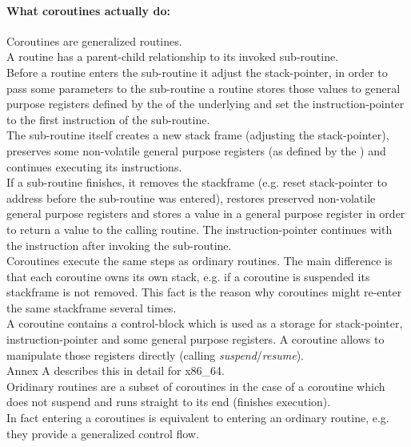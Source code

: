 \paragraph*{What coroutines actually do:}
Coroutines are generalized routines.\\
\newline
A routine has a parent-child relationship to its invoked sub-routine.\\
Before a routine enters the sub-routine it adjust the stack-pointer, in order to
pass some parameters to the sub-routine a routine stores those values to general
purpose registers defined by the \cv of the underlying \ABI and set the
instruction-pointer to the first instruction of the sub-routine.\\
The sub-routine itself creates a new stack frame (adjusting the stack-pointer),
preserves some non-volatile general purpose registers (as defined by the \cv)
and continues executing its instructions.\\
If a sub-routine  finishes, it removes the stackframe (e.g. reset stack-pointer
to address before the sub-routine was entered), restores preserved non-volatile
general purpose registers and stores a value in a general purpose register in
order to return a value to the calling routine. The instruction-pointer continues
with the instruction after invoking the sub-routine.\\
\newline
Coroutines execute the same steps as ordinary routines. The main difference is 
that each coroutine owns its own stack, e.g. if a coroutine is suspended its
stackframe is not removed. This fact is the reason why coroutines might 
re-enter the same stackframe several times.\\
A coroutine contains a control-block which is used as a storage for
stack-pointer, instruction-pointer and some general purpose registers. A
coroutine allows to manipulate those registers directly (calling
\textit{suspend}/\textit{resume}).\\
Annex A describes this in detail for x86\_64.\\
\newline
Oridinary routines are a subset of coroutines in the case of a coroutine which
does not suspend and runs straight to its end (finishes execution).\\
\newline
In fact entering a coroutines is equivalent to entering an ordinary routine, e.g.
they provide a generalized control flow.
